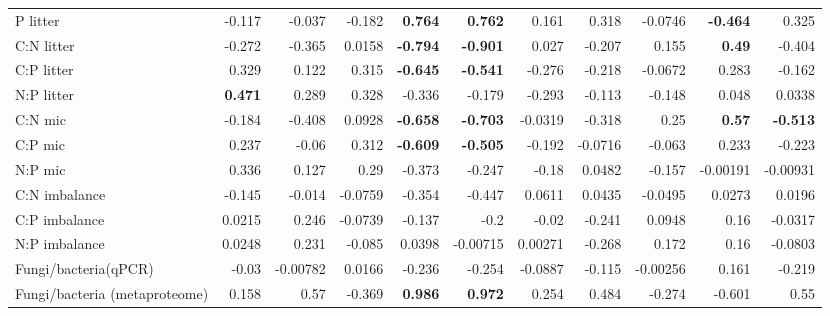 \documentclass[10pt]{article}
\begin{document}
\begin{flushleft}
\begin{landscape}
\begin{table}[h!]
\begin{center}
{\begin{tabular}{lrrrrrrrrrr}
  P litter & -0.117 & -0.037 & -0.182 & \textbf{0.764} & \textbf{0.762} & 0.161 & 0.318 & -0.0746 & \textbf{-0.464} & 0.325 \\ 
  C:N litter & -0.272 & -0.365 & 0.0158 & \textbf{-0.794} & \textbf{-0.901} & 0.027 & -0.207 & 0.155 & \textbf{0.49} & -0.404 \\ 
  C:P litter & 0.329 & 0.122 & 0.315 & \textbf{-0.645} & \textbf{-0.541} & -0.276 & -0.218 & -0.0672 & 0.283 & -0.162 \\ 
  N:P litter & \textbf{0.471} & 0.289 & 0.328 & -0.336 & -0.179 & -0.293 & -0.113 & -0.148 & 0.048 & 0.0338 \\ 
  C:N mic & -0.184 & -0.408 & 0.0928 & \textbf{-0.658} & \textbf{-0.703} & -0.0319 & -0.318 & 0.25 & \textbf{0.57} & \textbf{-0.513} \\ 
  C:P mic & 0.237 & -0.06 & 0.312 & \textbf{-0.609} & \textbf{-0.505} & -0.192 & -0.0716 & -0.063 & 0.233 & -0.223 \\ 
  N:P mic & 0.336 & 0.127 & 0.29 & -0.373 & -0.247 & -0.18 & 0.0482 & -0.157 & -0.00191 & -0.00931 \\ 
  C:N imbalance & -0.145 & -0.014 & -0.0759 & -0.354 & -0.447 & 0.0611 & 0.0435 & -0.0495 & 0.0273 & 0.0196 \\ 
  C:P imbalance & 0.0215 & 0.246 & -0.0739 & -0.137 & -0.2 & -0.02 & -0.241 & 0.0948 & 0.16 & -0.0317 \\ 
  N:P imbalance & 0.0248 & 0.231 & -0.085 & 0.0398 & -0.00715 & 0.00271 & -0.268 & 0.172 & 0.16 & -0.0803 \\ 
  Fungi/bacteria(qPCR) & -0.03 & -0.00782 & 0.0166 & -0.236 & -0.254 & -0.0887 & -0.115 & -0.00256 & 0.161 & -0.219 \\ 
  Fungi/bacteria (metaproteome) & 0.158 & 0.57 & -0.369 & \textbf{0.986} & \textbf{0.972} & 0.254 & 0.484 & -0.274 & -0.601 & 0.55 \\ 
   \hline
\end{tabular}
}
\end{center}
\end{table}\end{landscape}


\end{flushleft}
\end{document}
